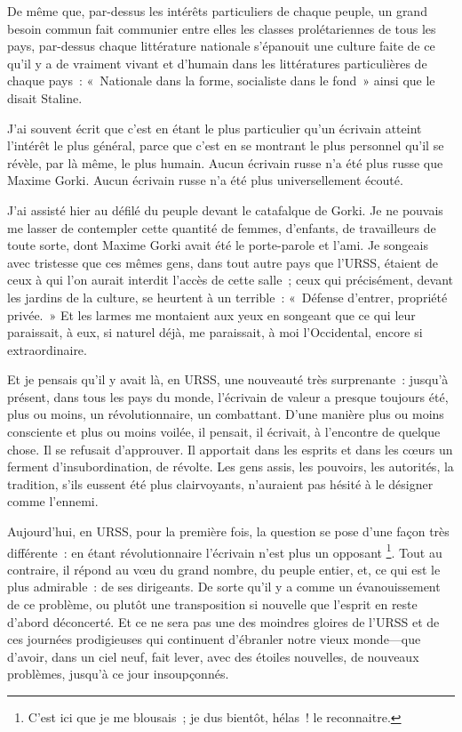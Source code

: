 \documentclass[french,twoside]{book} %
\begin{document}
De même que, par-dessus les intérêts particuliers de chaque peuple, un grand besoin commun fait communier entre elles les classes prolétariennes de tous les pays, par-dessus chaque littérature nationale s’épanouit une culture faite de ce qu’il y a de vraiment vivant et d’humain dans les littératures particulières de chaque pays : « Nationale dans la forme, socialiste dans le fond » ainsi que le disait Staline.\par
J’ai souvent écrit que c’est en étant le plus particulier qu’un écrivain atteint l’intérêt le plus général, parce que c’est en se montrant le plus personnel qu’il se révèle, par là même, le plus humain. Aucun écrivain russe n’a été plus russe que Maxime Gorki. Aucun écrivain russe n’a été plus universellement écouté.\par
J’ai assisté hier au défilé du peuple devant le catafalque de Gorki. Je ne pouvais me lasser de contempler cette quantité de femmes, d’enfants, de travailleurs de toute sorte, dont Maxime Gorki avait été le porte-parole et l’ami. Je songeais avec tristesse que ces mêmes gens, dans tout autre pays que l’URSS, étaient de ceux à qui l’on aurait interdit l’accès de cette salle ; ceux qui précisément, devant les jardins de la culture, se heurtent à un terrible : « Défense d’entrer, propriété privée. » Et les larmes me montaient aux yeux en songeant que ce qui leur paraissait, à eux, si naturel déjà, me paraissait, à moi l’Occidental, encore si extraordinaire.\par
Et je pensais qu’il y avait là, en URSS, une nouveauté très surprenante : jusqu’à présent, dans tous les pays du monde, l’écrivain de valeur a presque toujours été, plus ou moins, un révolutionnaire, un combattant. D’une manière plus ou moins consciente et plus ou moins voilée, il pensait, il écrivait, à l’encontre de quelque chose. Il se refusait d’approuver. Il apportait dans les esprits et dans les cœurs un ferment d’insubordination, de révolte. Les gens assis, les pouvoirs, les autorités, la tradition, s’ils eussent été plus clairvoyants, n’auraient pas hésité à le désigner comme l’ennemi.\par
Aujourd’hui, en URSS, pour la première fois, la question se pose d’une façon très différente : en étant révolutionnaire l’écrivain n’est plus un opposant \footnote{C’est ici que je me blousais ; je dus bientôt, hélas ! le reconnaitre.}. Tout au contraire, il répond au vœu du grand nombre, du peuple entier, et, ce qui est le plus admirable : de ses dirigeants. De sorte qu’il y a comme un évanouissement de ce problème, ou plutôt une transposition si nouvelle que l’esprit en reste d’abord déconcerté. Et ce ne sera pas une des moindres gloires de l’URSS et de ces journées prodigieuses qui continuent d’ébranler notre vieux monde—que d’avoir, dans un ciel neuf, fait lever, avec des étoiles nouvelles, de nouveaux problèmes, jusqu’à ce jour insoupçonnés.\par
\end{document}
